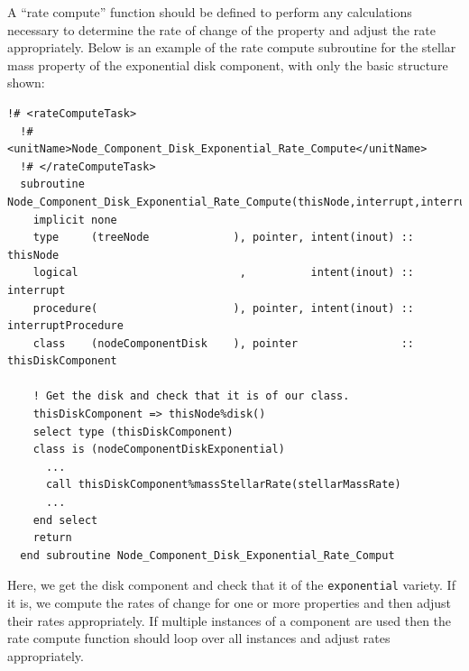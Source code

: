 A ``rate compute'' function should be defined to perform any calculations necessary to determine the rate of change of the property and adjust the rate appropriately. Below is an example of the rate compute subroutine for the stellar mass property of the exponential disk component, with only the basic structure shown:
\begin{lstlisting}[escapechar=@,breaklines,prebreak=\&,postbreak=\&]
  !# <rateComputeTask>
  !#  <unitName>Node_Component_Disk_Exponential_Rate_Compute</unitName>
  !# </rateComputeTask>
  subroutine Node_Component_Disk_Exponential_Rate_Compute(thisNode,interrupt,interruptProcedure)
    implicit none
    type     (treeNode             ), pointer, intent(inout) :: thisNode
    logical                         ,          intent(inout) :: interrupt
    procedure(                     ), pointer, intent(inout) :: interruptProcedure
    class    (nodeComponentDisk    ), pointer                :: thisDiskComponent
 
    ! Get the disk and check that it is of our class.
    thisDiskComponent => thisNode%disk()
    select type (thisDiskComponent)
    class is (nodeComponentDiskExponential)
      ...
      call thisDiskComponent%massStellarRate(stellarMassRate)
      ...
    end select
    return
  end subroutine Node_Component_Disk_Exponential_Rate_Comput
\end{lstlisting}
Here, we get the disk component and check that it of the {\tt exponential} variety. If it is, we compute the rates of change for one or more properties and then adjust their rates appropriately. If multiple instances of a component are used then the rate compute function should loop over all instances and adjust rates appropriately.

